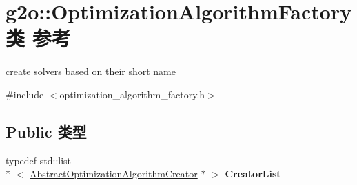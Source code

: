 \hypertarget{classg2o_1_1OptimizationAlgorithmFactory}{\section{g2o\-:\-:Optimization\-Algorithm\-Factory类 参考}
\label{classg2o_1_1OptimizationAlgorithmFactory}
}


create solvers based on their short name  




{\ttfamily \#include $<$optimization\-\_\-algorithm\-\_\-factory.\-h$>$}

\subsection*{Public 类型}
\begin{DoxyCompactItemize}
\item 
\hypertarget{classg2o_1_1OptimizationAlgorithmFactory_a3ed210b94bf09b47e30d07da3766b4ec}{typedef std\-::list\\*
$<$ \hyperlink{classg2o_1_1AbstractOptimizationAlgorithmCreator}{Abstract\-Optimization\-Algorithm\-Creator} $\ast$ $>$ {\bfseries Creator\-List}}\label{classg2o_1_1OptimizationAlgorithmFactory_a3ed210b94bf09b47e30d07da3766b4ec}

\end{DoxyCompactItemize}

